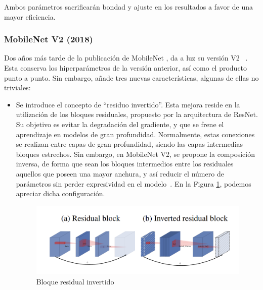 Ambos parámetros sacrificarán bondad y ajuste en los resultados a favor de una mayor eficiencia.

\subsubsection{MobileNet V2 (2018)}

Dos años más tarde de la publicación de MobileNet \cite{howard2017mobilenets}, da a luz su versión V2 ~\cite{sandler2019mobilenetv2}. Esta conserva los hiperparámetros  de la versión anterior, así como el producto punto a punto. Sin embargo, añade tres nuevas características, algunas de ellas no triviales:
\begin{itemize}
    \item Se introduce el concepto de ``residuo invertido''. Esta mejora reside en la utilización de los bloques residuales, propuesto por la arquitectura de ResNet. Su objetivo es evitar la degradación del gradiente, y que se frene el aprendizaje en modelos de gran profundidad. Normalmente, estas conexiones se realizan entre capas de gran profundidad, siendo las capas intermedias bloques estrechos. Sin embargo, en MobileNet V2, se propone la composición inversa, de forma que sean los bloques intermedios entre los residuales aquellos que poseen una mayor anchura, y así reducir el número de parámetros sin perder expresividad en el modelo~\cite{invertedresidualsv2}. En la Figura \ref{invert}, podemos apreciar dicha configuración.
    \begin{figure}[H]

    	\centering
    	\includegraphics[scale = 0.3]{imagenes/invertedres.png}
    	\caption{Bloque residual invertido}
    	 \label{invert}
    \end{figure}
    

\end{itemize}
